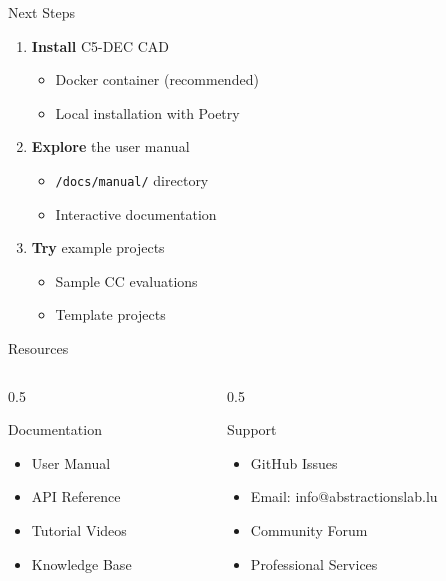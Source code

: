 \documentclass[
  11pt,
  ignorenonframetext,
  aspectratio=169,
]{beamer}
\providecommand{\tightlist}{%
  \setlength{\itemsep}{0pt}\setlength{\parskip}{0pt}}\usepackage{longtable,booktabs,array}
\begin{document}
\begin{frame}[fragile]{Next Steps}
\label{next-steps}
\begin{enumerate}
\tightlist
\item
  \textbf{Install} C5-DEC CAD

  \begin{itemize}
  \tightlist
  \item
    Docker container (recommended)
  \item
    Local installation with Poetry
  \end{itemize}
\item
  \textbf{Explore} the user manual

  \begin{itemize}
  \tightlist
  \item
    \texttt{/docs/manual/} directory
  \item
    Interactive documentation
  \end{itemize}
\item
  \textbf{Try} example projects

  \begin{itemize}
  \tightlist
  \item
    Sample CC evaluations
  \item
    Template projects
  \end{itemize}
\end{enumerate}
\end{frame}

\begin{frame}{Resources}
\label{resources}
\begin{columns}[T]
\begin{column}{0.5\linewidth}
\begin{block}{Documentation}
\label{documentation}
\begin{itemize}
\tightlist
\item
  User Manual
\item
  API Reference
\item
  Tutorial Videos
\item
  Knowledge Base
\end{itemize}
\end{block}
\end{column}

\begin{column}{0.5\linewidth}
\begin{block}{Support}
\label{support}
\begin{itemize}
\tightlist
\item
  GitHub Issues
\item
  Email: info@abstractionslab.lu
\item
  Community Forum
\item
  Professional Services
\end{itemize}
\end{block}
\end{column}
\end{columns}
\end{frame}
\end{document}
